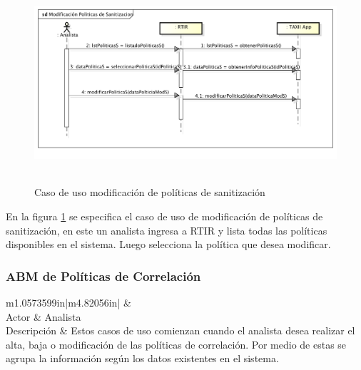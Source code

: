 \newpage
\begin{figure}[ht!]
	\centering
	\includegraphics[width=5.7638in,height=2.9256in]{Analisis22-img/Analisis22-img019.png} 
	\caption{Caso de uso modificación de políticas de sanitización}
	\label{fig.modificacionsanitizacion}
\end{figure}
\bigskip
{
	En la figura \ref{fig.modificacionsanitizacion} se especifica el caso de uso de modificación de políticas de sanitización, en este un analista ingresa a
	RTIR y lista todas las políticas disponibles en el sistema. Luego selecciona la política que desea modificar.}
\newpage
\subsubsection[ABM de Políticas de Correlación]{\foreignlanguage{spanish}{ABM de Políticas de Correlación}}
\begin{flushleft}
	\tablefirsthead{}
	\tablehead{}
	\tabletail{}
	\tablelasttail{}
	\begin{supertabular}{m{1.0573599in}|m{4.82056in}|}
		 &
		\\\hline
		{ Actor} &
		{ Analista}\\
		{ Descripción} &
		{ Estos casos de uso comienzan cuando el analista desea realizar el alta, baja o
			modificación de las políticas de correlación. Por medio de estas se agrupa la información según los datos existentes en
			el sistema.}\\\hhline{~-}
	\end{supertabular}
\end{flushleft}

